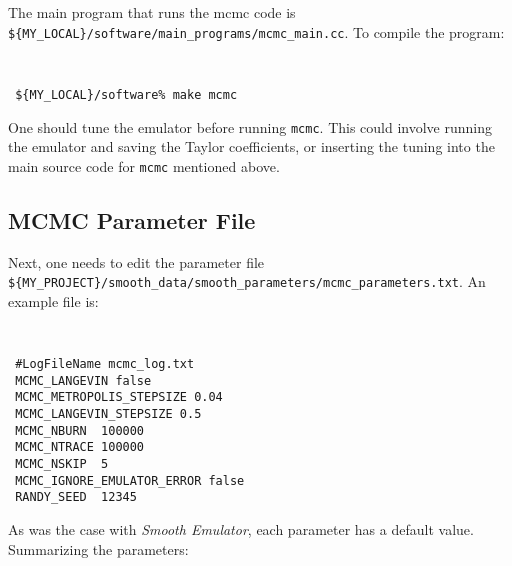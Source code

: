 \documentclass[UserManual.tex]{subfiles}
\begin{document}
The main program that runs the mcmc code is {\tt\$\{MY\_LOCAL\}/software/main\_programs/mcmc\_main.cc}. To compile the program:
{\tt
\begin{verbatim}
 ${MY_LOCAL}/software% make mcmc
\end{verbatim}}

One should tune the emulator before running {\tt mcmc}. This could involve running the emulator and saving the Taylor coefficients, or inserting the tuning into the main source code for {\tt mcmc} mentioned above.

\subsection{MCMC Parameter File}

Next, one needs to edit the parameter file {\tt\$\{MY\_PROJECT\}/smooth\_data/smooth\_parameters/mcmc\_parameters.txt}. An example file is:
{\tt
\begin{verbatim}
 #LogFileName mcmc_log.txt
 MCMC_LANGEVIN false
 MCMC_METROPOLIS_STEPSIZE 0.04
 MCMC_LANGEVIN_STEPSIZE 0.5
 MCMC_NBURN  100000
 MCMC_NTRACE 100000
 MCMC_NSKIP  5
 MCMC_IGNORE_EMULATOR_ERROR false
 RANDY_SEED  12345
\end{verbatim}}
As was the case with {\it Smooth Emulator}, each parameter has a default value. Summarizing the parameters:
\end{document}

